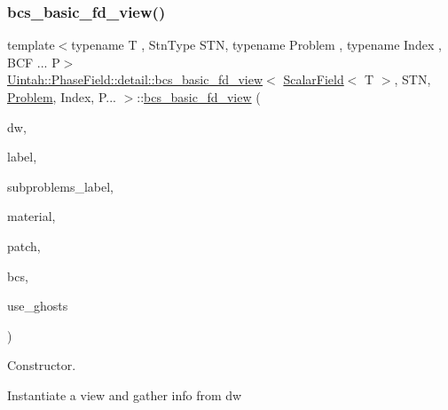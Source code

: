 \subsubsection{\texorpdfstring{bcs\+\_\+basic\+\_\+fd\+\_\+view()}{bcs\_basic\_fd\_view()}\hspace{0.1cm}{\footnotesize\ttfamily [3/4]}}
{\footnotesize\ttfamily template$<$typename T , Stn\+Type S\+TN, typename Problem , typename Index , B\+C\+F ... P$>$ \\
\hyperlink{classUintah_1_1PhaseField_1_1detail_1_1bcs__basic__fd__view}{Uintah\+::\+Phase\+Field\+::detail\+::bcs\+\_\+basic\+\_\+fd\+\_\+view}$<$ \hyperlink{structUintah_1_1PhaseField_1_1ScalarField}{Scalar\+Field}$<$ T $>$, S\+TN, \hyperlink{classUintah_1_1PhaseField_1_1Problem}{Problem}, Index, P... $>$\+::\hyperlink{classUintah_1_1PhaseField_1_1detail_1_1bcs__basic__fd__view}{bcs\+\_\+basic\+\_\+fd\+\_\+view} (\begin{DoxyParamCaption}\item[{Data\+Warehouse $\ast$}]{dw,  }\item[{const typename \hyperlink{structUintah_1_1PhaseField_1_1ScalarField_a7a77875e030da64c47ce9f6c22a06959}{Field\+::label\+\_\+type} \&}]{label,  }\item[{const Var\+Label $\ast$}]{subproblems\+\_\+label,  }\item[{int}]{material,  }\item[{const Patch $\ast$}]{patch,  }\item[{const std\+::vector$<$ \hyperlink{structUintah_1_1PhaseField_1_1BCInfo}{B\+C\+Info}$<$ \hyperlink{structUintah_1_1PhaseField_1_1ScalarField}{Field} $>$ $>$ \&}]{bcs,  }\item[{bool}]{use\+\_\+ghosts }\end{DoxyParamCaption})\hspace{0.3cm}{\ttfamily [inline]}}



Constructor. 

Instantiate a view and gather info from dw


